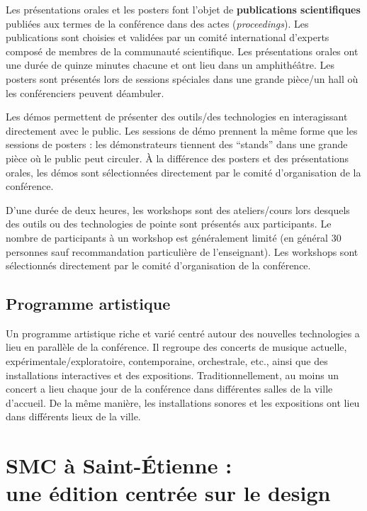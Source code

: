 \documentclass[fontsize=12pt]{scrartcl} %
\numberwithin{equation}{section} %
\numberwithin{figure}{section} %
\numberwithin{table}{section} %
\begin{document}
Les présentations orales et les posters font l'objet de \textbf{publications scientifiques} publiées aux termes de la conférence dans des actes (\textit{proceedings}). Les publications sont choisies et validées par un comité international d'experts composé de membres de la communauté scientifique. Les présentations orales ont une durée de quinze minutes chacune et ont lieu dans un amphithéâtre. Les posters sont présentés lors de sessions spéciales dans une grande pièce/un hall où les conférenciers peuvent déambuler. 

Les démos permettent de présenter des outils/des technologies en interagissant directement avec le public. Les sessions de démo prennent la même forme que les sessions de posters : les démonstrateurs tiennent des ``stands'' dans une grande pièce où le public peut circuler. À la différence des posters et des présentations orales, les démos sont sélectionnées directement par le comité d'organisation de la conférence.

D'une durée de deux heures, les workshops sont des ateliers/cours lors desquels des outils ou des technologies de pointe sont présentés aux participants. Le nombre de participants à un workshop est généralement limité (en général 30 personnes sauf recommandation particulière de l'enseignant). Les workshops sont sélectionnés directement par le comité d'organisation de la conférence.

\subsection{Programme artistique} 

Un programme artistique riche et varié centré autour des nouvelles technologies a lieu en parallèle de la conférence. Il regroupe des concerts de musique actuelle, expérimentale/exploratoire, contemporaine, orchestrale, etc., ainsi que des installations interactives et des expositions. Traditionnellement, au moins un concert a lieu chaque jour de la conférence dans différentes salles de la ville d'accueil. De la même manière, les installations sonores et les expositions ont lieu dans différents lieux de la ville.

\section{SMC à Saint-Étienne :\\une édition centrée sur le design}
\end{document}
